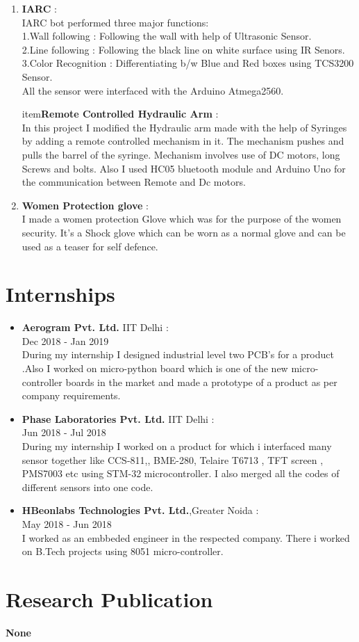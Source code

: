 \documentclass[11pt]{article}
\begin{document}
\begin{enumerate}[label=(\arabic*)]
\item\textbf{IARC} :\\
IARC bot performed three major functions:\\
1.Wall following : Following the wall with help of Ultrasonic Sensor.\\
2.Line following : Following the black line on white surface using IR Senors.\\
3.Color Recognition :  Differentiating b/w Blue and Red boxes using TCS3200 Sensor.\\                                     
All the sensor were interfaced with the Arduino Atmega2560.

item\textbf{Remote Controlled Hydraulic Arm} :\\
In this project I modified the Hydraulic arm made with the help of Syringes by adding a remote controlled mechanism in it. The mechanism pushes and pulls the barrel of the syringe. Mechanism involves use of DC motors, long Screws and bolts. Also I used HC05 bluetooth module and Arduino Uno for the communication between Remote and Dc motors.

\item\textbf{Women Protection glove} :\\
I made a women protection Glove which was for the purpose of the women security.
It's a Shock glove which can be worn as a normal glove and can be used as a teaser for self defence.
\end{enumerate}

\section{Internships} 
\begin{itemize}
\item\textbf{Aerogram Pvt. Ltd.} IIT Delhi :\\
Dec 2018 - Jan 2019\\
During my internship I designed industrial level two PCB's for a product .Also I worked on micro-python board which is one of the new micro-controller boards in the market and made a prototype of a product as per company requirements.
 
\item\textbf{Phase Laboratories Pvt. Ltd.} IIT Delhi :\\
Jun 2018 - Jul 2018\\
During my internship I worked on a product for which i interfaced many sensor together like CCS-811,, BME-280, Telaire T6713 , TFT screen , PMS7003 etc using STM-32 microcontroller. I also merged all the codes of different sensors into one code.

\item\textbf{HBeonlabs Technologies Pvt. Ltd.},Greater Noida :\\ 
May 2018 - Jun 2018\\
I worked as an embbeded engineer in the respected company. There i worked on B.Tech projects using 8051 micro-controller.

\end{itemize}

\section{Research Publication}
\textbf{None}
\end{document}
